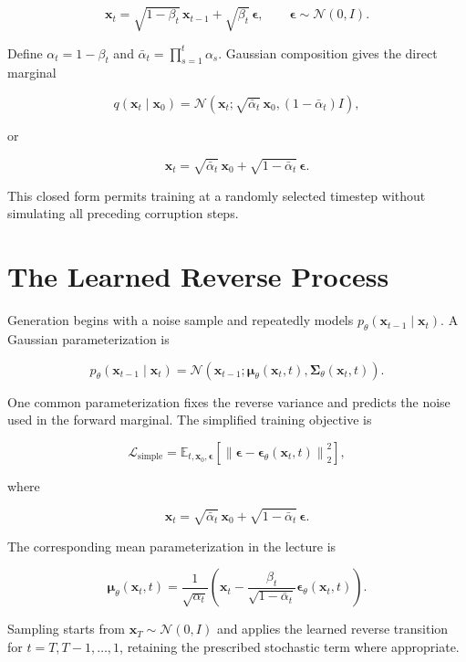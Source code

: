 \documentclass{article}
\begin{document}
\[
\mathbf{x}_t
=\sqrt{1-\beta_t}\,\mathbf{x}_{t-1}
+\sqrt{\beta_t}\,\boldsymbol{\epsilon},
\qquad
\boldsymbol{\epsilon}\sim\mathcal{N}(0,I).
\]

Define $\alpha_t=1-\beta_t$ and
$\bar\alpha_t=\prod_{s=1}^{t}\alpha_s$. Gaussian composition gives the direct
marginal

\[
q(\mathbf{x}_t\mid\mathbf{x}_0)
=\mathcal{N}\!\left(
\mathbf{x}_t;
\sqrt{\bar\alpha_t}\,\mathbf{x}_0,
(1-\bar\alpha_t)I
\right),
\]

or

\[
\mathbf{x}_t
=\sqrt{\bar\alpha_t}\,\mathbf{x}_0
+\sqrt{1-\bar\alpha_t}\,\boldsymbol{\epsilon}.
\]

This closed form permits training at a randomly selected timestep without simulating
all preceding corruption steps.

\section{The Learned Reverse Process}

Generation begins with a noise sample and repeatedly models
$p_{\theta}(\mathbf{x}_{t-1}\mid\mathbf{x}_t)$. A Gaussian parameterization is

\[
p_{\theta}(\mathbf{x}_{t-1}\mid\mathbf{x}_t)
=\mathcal{N}\!\left(
\mathbf{x}_{t-1};
\boldsymbol{\mu}_{\theta}(\mathbf{x}_t,t),
\boldsymbol{\Sigma}_{\theta}(\mathbf{x}_t,t)
\right).
\]

One common parameterization fixes the reverse variance and predicts the noise used in
the forward marginal. The simplified training objective is

\[
\mathcal{L}_{\mathrm{simple}}
=\mathbb{E}_{t,\mathbf{x}_0,\boldsymbol{\epsilon}}
\left[
\left\|
\boldsymbol{\epsilon}
-\boldsymbol{\epsilon}_{\theta}(\mathbf{x}_t,t)
\right\|_2^2
\right],
\]

where

\[
\mathbf{x}_t
=\sqrt{\bar\alpha_t}\,\mathbf{x}_0
+\sqrt{1-\bar\alpha_t}\,\boldsymbol{\epsilon}.
\]

The corresponding mean parameterization in the lecture is

\[
\boldsymbol{\mu}_{\theta}(\mathbf{x}_t,t)
=\frac{1}{\sqrt{\alpha_t}}
\left(
\mathbf{x}_t
-\frac{\beta_t}{\sqrt{1-\bar\alpha_t}}
\boldsymbol{\epsilon}_{\theta}(\mathbf{x}_t,t)
\right).
\]

Sampling starts from $\mathbf{x}_T\sim\mathcal{N}(0,I)$ and applies the learned
reverse transition for $t=T,T-1,\ldots,1$, retaining the prescribed stochastic term
where appropriate.
\end{document}
